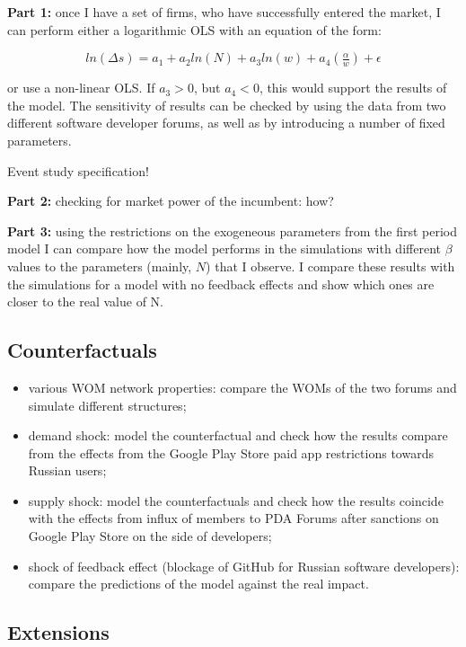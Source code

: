 \documentclass{article}
\numberwithin{figure}{section}
\numberwithin{table}{section}
\theoremstyle{indented}
\numberwithin{equation}{section} %
\begin{document}
\textbf{Part 1:} once I have a set of firms, who have successfully entered the market, I can perform either a logarithmic OLS with an equation of the form:

$$ln(\Delta s) = a_1 + a_2ln(N) + a_3ln(w) +a_4(\tfrac{\alpha}{w}) +\epsilon$$ 

or use a non-linear OLS. If $a_3>0$, but $a_4<0$, this would support the results of the model. The sensitivity of results can be checked by using the data from two different software developer forums, as well as by introducing a number of fixed parameters. 

Event study specification!

\textbf{Part 2:} checking for market power of the incumbent: how?

\textbf{Part 3:} using the restrictions on the exogeneous parameters from the first period model I can compare how the model performs in the simulations with different $\beta$ values to the parameters (mainly, $N$) that I observe. I compare these results with the simulations for a model with no feedback effects and show which ones are closer to the real value of N.


\subsection{Counterfactuals}
\begin{itemize}
    \item various WOM network properties:
    compare the WOMs of the two forums and simulate different structures;
    \item demand shock: 
    model the counterfactual and check how the results compare from the effects from the Google Play Store paid app restrictions towards Russian users;
    \item supply shock: 
    model the counterfactuals and check how the results coincide with the effects from influx of members to PDA Forums after sanctions on Google Play Store on the side of developers;
    \item shock of feedback effect (blockage of GitHub for Russian software developers): compare the predictions of the model against the real impact.
\end{itemize}

\subsection{Extensions}
\end{document}
